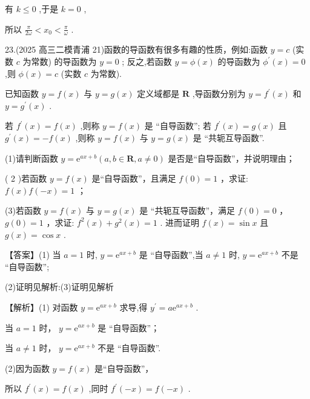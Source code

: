 \documentclass[10pt]{article}
\begin{document}
有 \(k \leq  0\) ,于是 \(k = 0\) ,

所以 \(\frac{\pi }{2\omega } < {x}_{0} < \frac{\pi }{\omega }\) .

23.(2025 高三二模青浦 21)函数的导函数有很多有趣的性质，例如:函数 \(y = c\) (实数 \(c\) 为常数) 的导函数为 \(y = 0\) ; 反之,若函数 \(y = \phi \left( x\right)\) 的导函数为 \({\phi }^{\prime }\left( x\right)  = 0\) ,则 \(\phi \left( x\right)  = c\) (实数 \(c\) 为常数).

已知函数 \(y = f\left( x\right)\) 与 \(y = g\left( x\right)\) 定义域都是 \(\mathbf{R}\) ,导函数分别为 \(y = {f}^{\prime }\left( x\right)\) 和 \(y = {g}^{\prime }\left( x\right)\) .

若 \({f}^{\prime }\left( x\right)  = f\left( x\right)\) ,则称 \(y = f\left( x\right)\) 是 “自导函数”; 若 \({f}^{\prime }\left( x\right)  = g\left( x\right)\) 且 \({g}^{\prime }\left( x\right)  =  - f\left( x\right)\) ,则称 \(y = f\left( x\right)\) 与 \(y = g\left( x\right)\) 是 “共轭互导函数”.

(1)请判断函数 \(y = {\mathrm{e}}^{{ax} + b}\left( {a,b \in  \mathbf{R},a \neq  0}\right)\) 是否是“自导函数”，并说明理由；

( 2 )若函数 \(y = f\left( x\right)\) 是“自导函数”，且满足 \(f\left( 0\right)  = 1\) ，求证: \(f\left( x\right) f\left( {-x}\right)  = 1\) ；

(3)若函数 \(y = f\left( x\right)\) 与 \(y = g\left( x\right)\) 是 “共轭互导函数”，满足 \(f\left( 0\right)  = 0\) ， \(g\left( 0\right)  = 1\) ，求证: \({f}^{2}\left( x\right)  + {g}^{2}\left( x\right)  = 1\) . 进而证明 \(f\left( x\right)  = \sin x\) 且 \(g\left( x\right)  = \cos x\) .

【答案】(1) 当 \(a = 1\) 时, \(y = {\mathrm{e}}^{{ax} + b}\) 是 “自导函数”,当 \(a \neq  1\) 时, \(y = {\mathrm{e}}^{{ax} + b}\) 不是 “自导函数”;

(2)证明见解析:(3)证明见解析

【解析】(1) 对函数 \(y = {\mathrm{e}}^{{ax} + b}\) 求导,得 \({y}^{\prime } = a{\mathrm{e}}^{{ax} + b}\) .

当 \(a = 1\) 时， \(y = {\mathrm{e}}^{{ax} + b}\) 是 “自导函数”；

当 \(a \neq  1\) 时， \(y = {\mathrm{e}}^{{ax} + b}\) 不是 “自导函数”.

(2)因为函数 \(y = f\left( x\right)\) 是“自导函数”，

所以 \({f}^{\prime }\left( x\right)  = f\left( x\right)\) ,同时 \({f}^{\prime }\left( {-x}\right)  = f\left( {-x}\right)\) .
\end{document}
